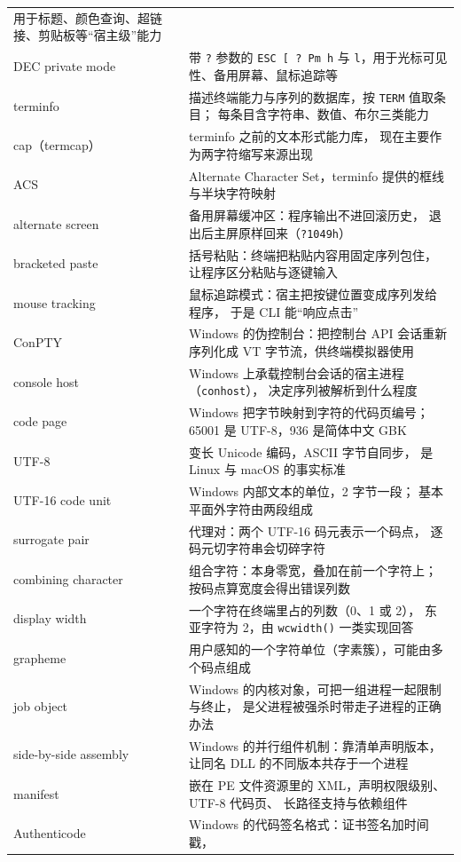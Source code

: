 \documentclass[12pt,a4paper,fontset=fandol]{ctexbook}
\newcommand{\Fn}[1]{\texttt{#1()}}
\newcommand{\Tp}[1]{\texttt{#1}}
\begin{document}
\begin{longtable}{@{}>{\raggedright\arraybackslash}p{}
                 >{\raggedright\arraybackslash}p{}@{}}
用于标题、颜色查询、超链接、剪贴板等``宿主级''能力 \\
DEC private mode & 带 \Tp{?} 参数的 \Tp{ESC [ ? Pm h} 与
\Tp{l}，用于光标可见性、备用屏幕、鼠标追踪等 \\
terminfo & 描述终端能力与序列的数据库，按 \Tp{TERM} 值取条目；
每条目含字符串、数值、布尔三类能力 \\
cap（termcap） & terminfo 之前的文本形式能力库，
现在主要作为两字符缩写来源出现 \\
ACS & Alternate Character Set，terminfo 提供的框线与半块字符映射 \\
alternate screen & 备用屏幕缓冲区：程序输出不进回滚历史，
退出后主屏原样回来（\Tp{?1049h}） \\
bracketed paste & 括号粘贴：终端把粘贴内容用固定序列包住，
让程序区分粘贴与逐键输入 \\
mouse tracking & 鼠标追踪模式：宿主把按键位置变成序列发给程序，
于是 CLI 能``响应点击'' \\
ConPTY & Windows 的伪控制台：把控制台 API 会话重新序列化成
VT 字节流，供终端模拟器使用 \\
console host & Windows 上承载控制台会话的宿主进程（\Tp{conhost}），
决定序列被解析到什么程度 \\
code page & Windows 把字节映射到字符的代码页编号；
65001 是 UTF-8，936 是简体中文 GBK \\
UTF-8 & 变长 Unicode 编码，ASCII 字节自同步，
是 Linux 与 macOS 的事实标准 \\
UTF-16 code unit & Windows 内部文本的单位，2 字节一段；
基本平面外字符由两段组成 \\
surrogate pair & 代理对：两个 UTF-16 码元表示一个码点，
逐码元切字符串会切碎字符 \\
combining character & 组合字符：本身零宽，叠加在前一个字符上；
按码点算宽度会得出错误列数 \\
display width & 一个字符在终端里占的列数（0、1 或 2），
东亚字符为 2，由 \Fn{wcwidth} 一类实现回答 \\
grapheme & 用户感知的一个字符单位（字素簇），可能由多个码点组成 \\
job object & Windows 的内核对象，可把一组进程一起限制与终止，
是父进程被强杀时带走子进程的正确办法 \\
side-by-side assembly & Windows 的并行组件机制：靠清单声明版本，
让同名 DLL 的不同版本共存于一个进程 \\
manifest & 嵌在 PE 文件资源里的 XML，声明权限级别、UTF-8 代码页、
长路径支持与依赖组件 \\
Authenticode & Windows 的代码签名格式：证书签名加时间戳，

\end{longtable}
\end{document}
